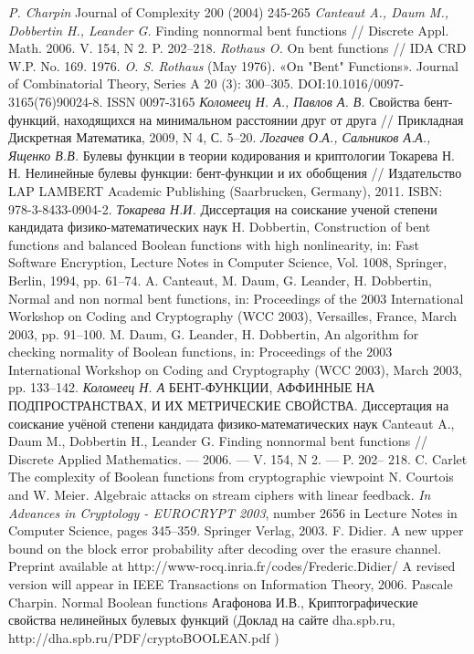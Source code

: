 \begin{thebibliography}{99}
 {\it P. Charpin} Journal of Complexity 200 (2004) 245-265
 {\it Canteaut A., Daum M., Dobbertin H., Leander G.} Finding nonnormal bent
functions // Discrete Appl. Math. 2006. V. 154, N 2. P. 202–218.
 {\it Rothaus O.} On bent functions // IDA CRD W.P. No. 169. 1976.
  {\it O. S. Rothaus} (May 1976). «On "Bent" Functions». Journal of Combinatorial Theory, Series A 20 (3): 300–305. DOI:10.1016/0097-3165(76)90024-8. ISSN 0097-3165
 {\it Коломеец Н. А., Павлов А. В.} Свойства бент-функций, находящихся
на минимальном расстоянии друг от друга // Прикладная Дискретная
Математика, 2009, N 4, С. 5–20.
 {\it Логачев О.А., Сальников А.А., Ященко В.В.} Булевы функции в теории кодирования и криптологии
Токарева Н. Н. Нелинейные булевы функции: бент-функции и их обобщения // Издательство LAP
LAMBERT Academic Publishing (Saarbrucken, Germany), 2011. ISBN: 978-3-8433-0904-2.
 {\it Токарева Н.И.} Диссертация на соискание ученой степени
кандидата физико-математических наук
 H. Dobbertin, Construction of bent functions and balanced Boolean functions with high
nonlinearity, in: Fast Software Encryption, Lecture Notes in Computer Science, Vol. 1008, Springer,
Berlin, 1994, pp. 61–74.
A. Canteaut, M. Daum, G. Leander, H. Dobbertin, Normal and non normal bent functions, in:
Proceedings of the 2003 International Workshop on Coding and Cryptography (WCC 2003),
Versailles, France, March 2003, pp. 91–100.
 M. Daum, G. Leander, H. Dobbertin, An algorithm for checking normality of Boolean functions, in:
Proceedings of the 2003 International Workshop on Coding and Cryptography (WCC 2003), March
2003, pp. 133–142.
 {\it Коломеец Н. А} БЕНТ-ФУНКЦИИ, АФФИННЫЕ НА ПОДПРОСТРАНСТВАХ, И ИХ
МЕТРИЧЕСКИЕ СВОЙСТВА. Диссертация на соискание учёной степени
кандидата физико-математических наук
 Canteaut A., Daum M., Dobbertin H., Leander G. Finding nonnormal bent
functions // Discrete Applied Mathematics. — 2006. — V. 154, N 2. — P. 202–
218.
 C. Carlet The complexity of Boolean functions from cryptographic viewpoint
N. Courtois and W. Meier. Algebraic attacks on stream ciphers with linear feedback. {\it In Advances in Cryptology - EUROCRYPT 2003}, number 2656 in Lecture Notes in Computer Science, pages 345–359. Springer Verlag,  2003.
 F. Didier. A new upper bound on the block error probability after decoding over the erasure channel. Preprint available at http://www-rocq.inria.fr/codes/Frederic.Didier/ A revised version will appear in IEEE Transactions on Information Theory, 2006.
 Pascale Charpin. Normal Boolean functions
 Агафонова И.В., Криптографические свойства нелинейных булевых функций (Доклад на сайте dha.spb.ru, http://dha.spb.ru/PDF/cryptoBOOLEAN.pdf )





\end{thebibliography}
